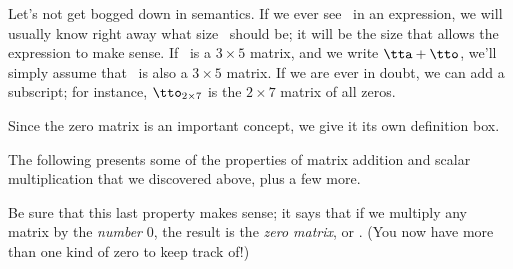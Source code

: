 
Let's not get bogged down in semantics. If we ever see \tto\ in an expression, we will usually know right away what size \tto\ should be; it will be the size that allows the expression to make sense. If \tta\ is a $3\times 5$ matrix, and we write $\tta + \tto$, we'll simply assume that \tto\ is also a $3\times 5$ matrix. If we are ever in doubt, we can add a subscript; for instance, $\tto_{2\times 7}$ is the $2\times7$ matrix of all zeros.

Since the zero matrix is an important concept, we give it its own definition box.

\smallskip


\smallskip


The following presents some of the properties of matrix addition and scalar multiplication that we discovered above, plus a few more.

\smallskip


\smallskip

Be sure that this last property makes sense; it says that if we multiply any matrix by the \textit{number} 0, the result is the \textit{zero matrix}, or \tto. (You now have more than one kind of zero to keep track of!)


